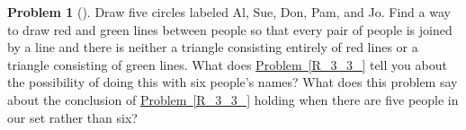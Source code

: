 \documentclass[10pt,]{book}
\theoremstyle{plain}
\theoremstyle{definition}
\newtheorem{activity}[project]{Problem}
\theoremstyle{definition}
\numberwithin{equation}{chapter}
\begin{document}
\begin{activity}[] \label{notR_3_3_}
\hypertarget{p-387}{}%
Draw five circles labeled Al, Sue, Don, Pam, and Jo. Find a way to draw red and green lines between people so that every pair of people is joined by a line and there is neither a triangle consisting entirely of red lines or a triangle consisting of green lines. What does \hyperref[R_3_3_]{Problem~\ref{R_3_3_}} tell you about the possibility of doing this with six people's names? What does this problem say about the conclusion of \hyperref[R_3_3_]{Problem~\ref{R_3_3_}} holding when there are five people in our set rather than six?%
\end{activity}
\typeout{************************************************}
\typeout{************************************************}
\end{document}
